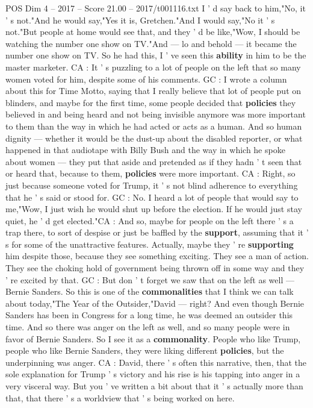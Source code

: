 \begin{textsample}{POS Dim 4 – 2017 – Score 21.00 – 2017/t001116.txt}
I ' d say back to him,"No, it ' s not."And he would say,"Yes it is, Gretchen."And I would say,"No it ' s not."But people at home would see that, and they ' d be like,"Wow, I should be watching the number one show on TV."And — lo and behold — it became the number one show on TV.
So he had this, I ' ve seen this \textbf{ability} in him to be the master marketer.
CA : It ' s puzzling to a lot of people on the left that so many women voted for him, despite some of his comments.
GC : I wrote a column about this for Time Motto, saying that I really believe that lot of people put on blinders, and maybe for the first time, some people decided that \textbf{policies} they believed in and being heard and not being invisible anymore was more important to them than the way in which he had acted or acts as a human.
And so human dignity — whether it would be the dust-up about the disabled reporter, or what happened in that audiotape with Billy Bush and the way in which he spoke about women — they put that aside and pretended as if they hadn ' t seen that or heard that, because to them, \textbf{policies} were more important.
CA : Right, so just because someone voted for Trump, it ' s not blind adherence to everything that he ' s said or stood for.
GC : No.
I heard a lot of people that would say to me,"Wow, I just wish he would shut up before the election.
If he would just stay quiet, he ' d get elected."CA : And so, maybe for people on the left there ' s a trap there, to sort of despise or just be baffled by the \textbf{support}, assuming that it ' s for some of the unattractive features.
Actually, maybe they ' re \textbf{supporting} him despite those, because they see something exciting.
They see a man of action.
They see the choking hold of government being thrown off in some way and they ' re excited by that.
GC : But don ' t forget we saw that on the left as well — Bernie Sanders.
So this is one of the \textbf{commonalities} that I think we can talk about today,"The Year of the Outsider,"David — right?
And even though Bernie Sanders has been in Congress for a long time, he was deemed an outsider this time.
And so there was anger on the left as well, and so many people were in favor of Bernie Sanders.
So I see it as a \textbf{commonality}.
People who like Trump, people who like Bernie Sanders, they were liking different \textbf{policies}, but the underpinning was anger.
CA : David, there ' s often this narrative, then, that the sole explanation for Trump ' s victory and his rise is his tapping into anger in a very visceral way.
But you ' ve written a bit about that it ' s actually more than that, that there ' s a worldview that ' s being worked on here.

\end{textsample}
